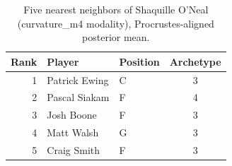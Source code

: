 \begin{table}[htbp]
  \centering\small
  \begin{tabular}{rllc}
    \toprule
    Rank & Player & Position & Archetype \\
    \midrule
    1 & Patrick Ewing & C & 3 \\
    2 & Pascal Siakam & F & 4 \\
    3 & Josh Boone & F & 3 \\
    4 & Matt Walsh & G & 3 \\
    5 & Craig Smith & F & 3 \\
    \bottomrule
  \end{tabular}
  \caption{Five nearest neighbors of Shaquille O'Neal (curvature_m4 modality), Procrustes-aligned posterior mean.}
  \label{tab:Shaquille_O_Neal_neighbors_curvature_m4}
\end{table}

